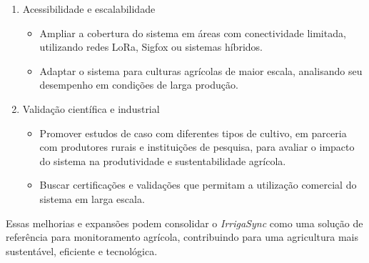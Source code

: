 \begin{enumerate}
    \item Acessibilidade e escalabilidade
        \begin{itemize}
            \item Ampliar a cobertura do sistema em áreas com conectividade limitada, utilizando redes LoRa, Sigfox ou sistemas híbridos.  
            \item Adaptar o sistema para culturas agrícolas de maior escala, analisando seu desempenho em condições de larga produção.  
        \end{itemize}
    \item Validação científica e industrial  
        \begin{itemize}
            \item Promover estudos de caso com diferentes tipos de cultivo, em parceria com produtores rurais e instituições de pesquisa, para avaliar o impacto do sistema na produtividade e sustentabilidade agrícola.  
            \item Buscar certificações e validações que permitam a utilização comercial do sistema em larga escala.  
        \end{itemize}
\end{enumerate}

Essas melhorias e expansões podem consolidar o \textit{IrrigaSync} como uma solução de referência para monitoramento agrícola, contribuindo para uma agricultura mais sustentável, eficiente e tecnológica.
